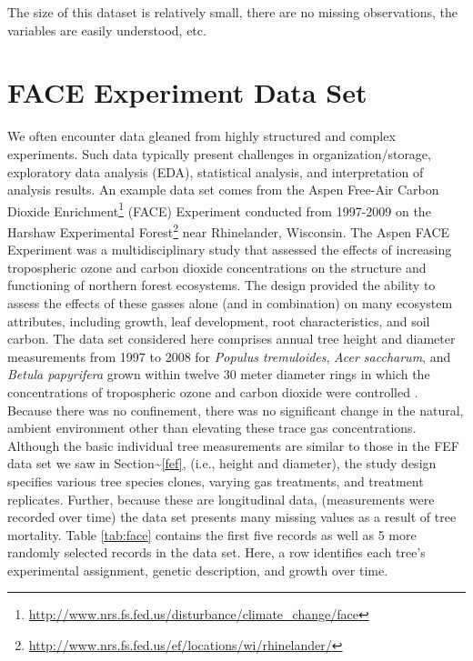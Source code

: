 \documentclass[]{krantz}
\renewcommand{\href}[2]{#2\footnote{\url{#1}}}
\theoremstyle{definition}
\theoremstyle{definition}
\theoremstyle{definition}
\theoremstyle{remark}
\begin{document}
The size of this dataset is relatively small, there are no missing
observations, the variables are easily understood, etc.

\section{FACE Experiment Data Set}\label{face-experiment-data-set}

We often encounter data gleaned from highly structured and complex
experiments. Such data typically present challenges in
organization/storage, exploratory data analysis (EDA), statistical
analysis, and interpretation of analysis results. An example data set
comes from the Aspen
\href{http://www.nrs.fs.fed.us/disturbance/climate_change/face}{Free-Air
Carbon Dioxide Enrichment} (FACE) Experiment conducted from 1997-2009 on
the \href{http://www.nrs.fs.fed.us/ef/locations/wi/rhinelander/}{Harshaw
Experimental Forest} near Rhinelander, Wisconsin. The Aspen FACE
Experiment was a multidisciplinary study that assessed the effects of
increasing tropospheric ozone and carbon dioxide concentrations on the
structure and functioning of northern forest ecosystems. The design
provided the ability to assess the effects of these gasses alone (and in
combination) on many ecosystem attributes, including growth, leaf
development, root characteristics, and soil carbon. The data set
considered here comprises annual tree height and diameter measurements
from 1997 to 2008 for \emph{Populus tremuloides}, \emph{Acer saccharum},
and \emph{Betula papyrifera} grown within twelve 30 meter diameter rings
in which the concentrations of tropospheric ozone and carbon dioxide
were controlled \citet{Kubiske2013}. Because there was no confinement,
there was no significant change in the natural, ambient environment
other than elevating these trace gas concentrations. Although the basic
individual tree measurements are similar to those in the FEF data set we
saw in Section\textasciitilde{}\ref{fef}, (i.e., height and diameter),
the study design specifies various tree species clones, varying gas
treatments, and treatment replicates. Further, because these are
longitudinal data, (measurements were recorded over time) the data set
presents many missing values as a result of tree mortality. Table
\ref{tab:face} contains the first five records as well as 5 more
randomly selected records in the data set. Here, a row identifies each
tree's experimental assignment, genetic description, and growth over
time.
\end{document}
